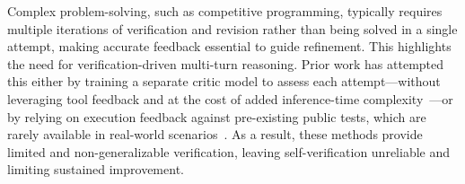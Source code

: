 \documentclass{article} %
\begin{document}
Complex problem-solving, such as competitive programming, typically requires multiple iterations of verification and revision rather than being solved in a single attempt, making accurate feedback essential to guide refinement. This highlights the need for verification-driven multi-turn reasoning. Prior work has attempted this either by training a separate critic model to assess each attempt—without leveraging tool feedback and at the cost of added inference-time complexity~\citep{xie2025teachinglanguagemodelscritique}—or by relying on execution feedback against pre-existing public tests, which are rarely available in real-world scenarios~\citep{gehring2025rlefgroundingcodellms}. As a result, these methods provide limited and non-generalizable verification, leaving self-verification unreliable and limiting sustained improvement.

\end{document}
